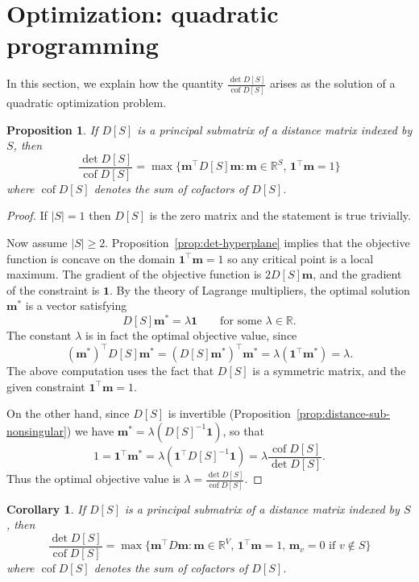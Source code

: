 \documentclass{amsart}
\newtheorem{prop}[thm]{Proposition}
\newtheorem{cor}[thm]{Corollary}
\theoremstyle{definition}
\newcommand{\RR}{\mathbb{R}}
\newcommand{\bone}{\mathbf{1}}
\newcommand{\boldm}{\mathbf{m}}
\newcommand{\tr}{\intercal}
\DeclareMathOperator{\cof}{cof}
\newcommand{\note}[1]{{\color{red} \sf $\diamondsuit$  {#1} $\diamondsuit$ }}
\begin{document}
\section{Optimization: quadratic programming}
\label{sec:optimization}

In this section, we explain how the quantity $\displaystyle \frac{\det D[S]}{\cof D[S]}$ arises as the solution of a quadratic optimization problem.

\begin{prop}
\label{prop:optimization}
If $D[S]$ is a principal submatrix of a distance matrix indexed by $S$, then 
\[
	\frac{\det D[S]}{\cof D[S]} = \max \{\boldm^\tr D[S] \boldm : \boldm \in \RR^S,\, \bone^\tr \boldm = 1 \}
\]
where $\cof D[S]$ denotes the sum of cofactors of $D[S]$.
\end{prop}

\begin{proof}
If $|S| = 1$ then $D[S]$ is the zero matrix and the statement is true trivially.

Now assume $|S| \geq 2$.
Proposition~\ref{prop:det-hyperplane} implies that 
the objective function is concave on the domain $\bone^\tr \boldm = 1$
so any critical point is a local maximum.
The gradient of the objective function is $2 D[S] \boldm$, 
and the gradient of the constraint is $\bone$.
By the theory of Lagrange multipliers, the optimal solution $\boldm^*$ is a vector satisfying
\[
	D[S] \boldm^* = \lambda \bone \qquad\text{for some }\lambda \in \RR.
\]
The constant $\lambda$ is in fact the optimal objective value, since
\[
	(\boldm^*)^\tr D[S] \boldm^* = (D[S] \boldm^*)^\tr \boldm^* = \lambda (\bone^\tr \boldm^*) = \lambda.
\]
The above computation uses the fact that $D[S]$ is a symmetric matrix, and the given constraint $\bone^\tr \boldm = 1$.

On the other hand,
since $D[S]$ is invertible (Proposition~\ref{prop:distance-sub-nonsingular}) we have $ \boldm^* = \lambda (D[S]^{-1} \bone) $, so that
\[
	1 = \bone^\tr \boldm^* = \lambda (\bone^\tr D[S]^{-1} \bone)
	= \lambda \frac{\cof D[S]}{\det D[S]}.
\]
Thus the optimal objective value is
$\displaystyle
	\lambda = \frac{\det D[S]}{\cof D[S]} .
$
\end{proof}

\begin{cor}
\label{cor:optimization}
If $D[S]$ is a principal submatrix of a distance matrix indexed by $S$, then 
\[
	\frac{\det D[S]}{\cof D[S]} = \max \{\boldm^\tr D \boldm : \boldm \in \RR^V,\, \bone^\tr \boldm = 1,\, \boldm_v = 0 \text{ if } v \not\in S \}
\]
where $\cof D[S]$ denotes the sum of cofactors of $D[S]$.
\end{cor}
\end{document}
